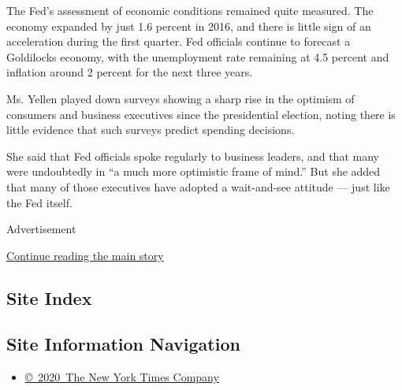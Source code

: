 The Fed's assessment of economic conditions remained quite measured. The
economy expanded by just 1.6 percent in 2016, and there is little sign
of an acceleration during the first quarter. Fed officials continue to
forecast a Goldilocks economy, with the unemployment rate remaining at
4.5 percent and inflation around 2 percent for the next three years.

Ms. Yellen played down surveys showing a sharp rise in the optimism of
consumers and business executives since the presidential election,
noting there is little evidence that such surveys predict spending
decisions.

She said that Fed officials spoke regularly to business leaders, and
that many were undoubtedly in ``a much more optimistic frame of mind.''
But she added that many of those executives have adopted a wait-and-see
attitude --- just like the Fed itself.

Advertisement

\protect\hyperlink{after-bottom}{Continue reading the main story}

\hypertarget{site-index}{%
\subsection{Site Index}\label{site-index}}

\hypertarget{site-information-navigation}{%
\subsection{Site Information
Navigation}\label{site-information-navigation}}

\begin{itemize}
\tightlist
\item
  \href{https://help.nytimes.com/hc/en-us/articles/115014792127-Copyright-notice}{©~2020~The
  New York Times Company}
\end{itemize}

